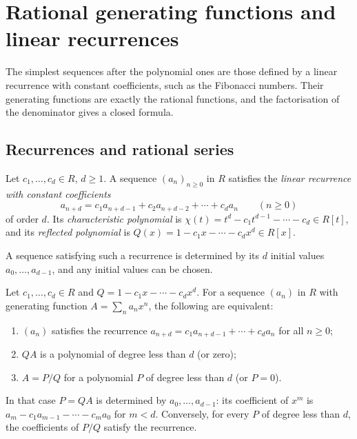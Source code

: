 \section{Rational generating functions and linear recurrences}\label{generating-functions:section-rational}

The simplest sequences after the polynomial ones are those defined by a linear recurrence with constant coefficients, such as the Fibonacci numbers. Their generating functions are exactly the
rational functions, and the factorisation of the denominator gives a closed formula.

\subsection{Recurrences and rational series}\label{generating-functions:subsection-recurrences}

\begin{definition}\label{generating-functions:definition-linear-recurrence}
Let $c_1, \ldots, c_d \in R$, $d \geq 1$. A sequence $(a_n)_{n \geq 0}$ in $R$ satisfies the \emph{linear recurrence with constant coefficients}
\[
a_{n+d} = c_1a_{n+d-1} + c_2a_{n+d-2} + \cdots + c_da_n \qquad (n \geq 0)
\]
of order $d$. Its \emph{characteristic polynomial} is $\chi(t) = t^d - c_1t^{d-1} - \cdots - c_d \in R[t]$, and its \emph{reflected polynomial} is $Q(x) = 1 - c_1x - \cdots - c_dx^d \in R[x]$.
\end{definition}

A sequence satisfying such a recurrence is determined by its $d$ initial values $a_0, \ldots, a_{d-1}$, and any initial values can be chosen.

\begin{theorem}\label{generating-functions:theorem-rational}
Let $c_1, \ldots, c_d \in R$ and $Q = 1 - c_1x - \cdots - c_dx^d$. For a sequence $(a_n)$ in $R$ with generating function $A = \sum_na_nx^n$, the following are equivalent:
\begin{enumerate}
\item $(a_n)$ satisfies the recurrence $a_{n+d} = c_1a_{n+d-1} + \cdots + c_da_n$ for all $n \geq 0$;
\item $QA$ is a polynomial of degree less than $d$ (or zero);
\item $A = P/Q$ for a polynomial $P$ of degree less than $d$ (or $P = 0$).
\end{enumerate}
In that case $P = QA$ is determined by $a_0, \ldots, a_{d-1}$: its coefficient of $x^m$ is $a_m - c_1a_{m-1} - \cdots - c_ma_0$ for $m < d$. Conversely, for every $P$ of degree less than $d$, the
coefficients of $P/Q$ satisfy the recurrence.
\end{theorem}

